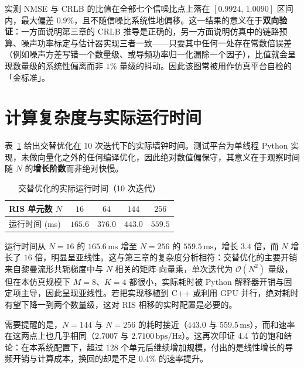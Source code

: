 实测 NMSE 与 CRLB 的比值在全部七个信噪比点上落在 $[0.9924,\,1.0090]$ 区间内，最大偏差 $0.9\%$，且不随信噪比系统性地偏移。这一结果的意义在于\textbf{双向验证}：一方面说明第三章的 CRLB 推导是正确的，另一方面说明仿真中的链路预算、噪声功率标定与估计器实现三者一致——只要其中任何一处存在常数倍误差（例如噪声方差写错一个数量级、或导频功率归一化漏除一个因子），比值就会呈现数量级的系统性偏离而非 $1\%$ 量级的抖动。因此该图常被用作仿真平台自检的「金标准」。

\section{计算复杂度与实际运行时间}
\label{sec:exp_runtime}

表~\ref{tab:exp_runtime} 给出交替优化在 10 次迭代下的实际墙钟时间。测试平台为单线程 Python 实现，未做向量化之外的任何编译优化，因此绝对数值偏保守，其意义在于观察时间随 $N$ 的\textbf{增长阶数}而非绝对快慢。

\begin{table}[htbp]
  \centering
  \small
  \caption{交替优化的实际运行时间（10 次迭代）}
  \label{tab:exp_runtime}
  \begin{tabular*}{\textwidth}{@{\extracolsep{\fill}}lcccc@{}}
    \toprule
    \textbf{RIS 单元数 $N$} & $16$ & $64$ & $144$ & $256$ \\
    \midrule
    运行时间 (ms) & $165.6$ & $376.0$ & $443.0$ & $559.5$ \\
    \bottomrule
  \end{tabular*}
\end{table}

运行时间从 $N=16$ 的 $165.6\,\mathrm{ms}$ 增至 $N=256$ 的 $559.5\,\mathrm{ms}$，增长 $3.4$ 倍，而 $N$ 增长了 $16$ 倍，明显呈亚线性。这与第三章的复杂度分析相符：交替优化的主要开销来自黎曼流形共轭梯度中与 $N$ 相关的矩阵-向量乘，单次迭代为 $\mathcal{O}(N^{2})$ 量级，但在本仿真规模下 $M=8$、$K=4$ 都很小，实际耗时被 Python 解释器开销与固定项主导，因此呈现亚线性。若把实现移植到 C++ 或利用 GPU 并行，绝对耗时有望下降一到两个数量级，这对 RIS 相移的实时配置是必要的。

需要提醒的是，$N=144$ 与 $N=256$ 的耗时接近（$443.0$ 与 $559.5\,\mathrm{ms}$），而和速率在这两点上也几乎相同（$2.7007$ 与 $2.7100\,\mathrm{bps/Hz}$）。这再次印证 4.4 节的饱和结论：在本系统配置下，超过 $128$ 个单元后继续增加规模，付出的是线性增长的导频开销与计算成本，换回的却是不足 $0.4\%$ 的速率提升。

